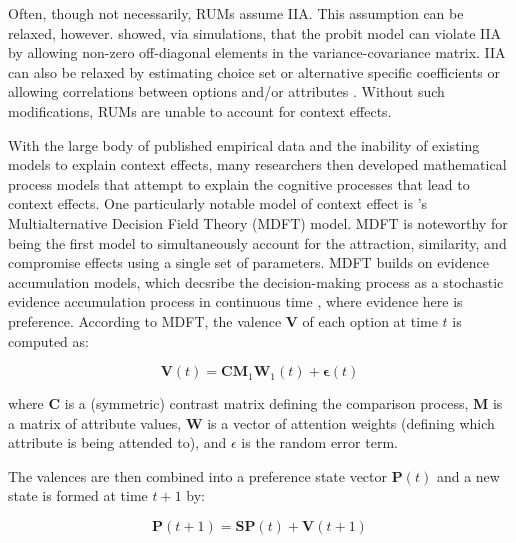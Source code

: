 Often, though not necessarily, RUMs assume IIA. This assumption can be relaxed, however. \textcite{paetzUtilityIndependenceIIA2018} showed, via simulations, that the probit model can violate IIA by allowing non-zero off-diagonal elements in the variance-covariance matrix. IIA can also be relaxed by estimating choice set or alternative specific coefficients \parencite{rooderkerk2011incorporating} or allowing correlations between options and/or attributes \parencite{haaijer1998utility}. Without such modifications, RUMs are unable to account for context effects. 

With the large body of published empirical data and the inability of existing models to explain context effects, many researchers then developed mathematical process models that attempt to explain the cognitive processes that lead to context effects. One particularly notable model of context effect is \textcite{roeMultialternativeDecisionField2001a}'s Multialternative Decision Field Theory (MDFT) model. MDFT is noteworthy for being the first model to simultaneously account for the attraction, similarity, and compromise effects using a single set of parameters. MDFT builds on evidence accumulation models, which decsribe the decision-making process as a stochastic evidence accumulation process in continuous time \parencite{ratcliff1978theory}, where evidence here is preference. According to MDFT, the valence $\boldsymbol{V}$ of each option at time $t$ is computed as:


\begin{equation}
    \boldsymbol{V}(t)=\boldsymbol{C}\bm{M}_1\boldsymbol{W}_1(t) + \boldsymbol{\epsilon}(t)
    \label{eqn:mdft}
\end{equation}

where $\boldsymbol{C}$ is a (symmetric) contrast matrix defining the comparison process, $\boldsymbol{M}$ is a matrix of attribute values, $\boldsymbol{W}$ is a vector of attention weights (defining which attribute is being attended to), and $\epsilon$ is the random error term. 

The valences are then combined into a preference state vector $\boldsymbol{P}(t)$ and a new state is formed at time $t+1$ by:

\begin{equation}
    \boldsymbol{P}(t+1)=\boldsymbol{SP}(t)+\boldsymbol{V}(t+1)
    \label{eqn:mdft1}
\end{equation}

